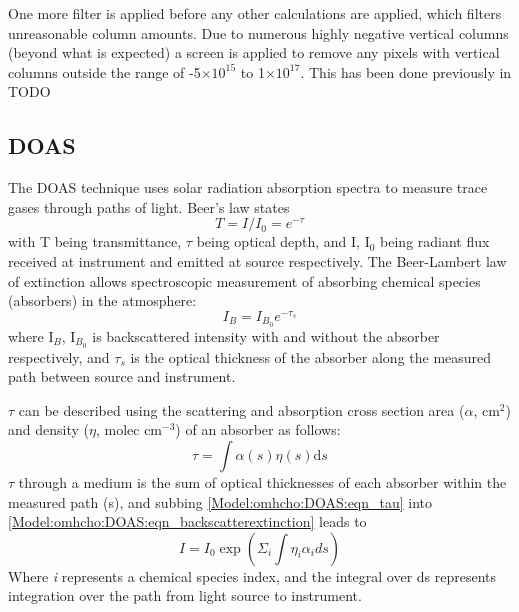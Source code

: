   One more filter is applied before any other calculations are applied, which filters unreasonable column amounts.
  Due to numerous highly negative vertical columns (beyond what is expected) a screen is applied to remove any pixels with vertical columns outside the range of -5$\times 10^{15}$ to 1$\times 10^{17}$.
  This has been done previously in TODO %
  
  \subsection{DOAS}
    \label{Model:omhcho:DOAS}
    
    The DOAS technique uses solar radiation absorption spectra to measure trace gases through paths of light.
    Beer's law states
    \begin{equation} \label{Model:omhcho:DOAS:eqn_beerslaw}
    T = I/I_0 = e^{-\tau}
    \end{equation}
    with T being transmittance, $\tau$ being optical depth, and I, I$_0$ being radiant flux received at instrument and emitted at source respectively.
    The Beer-Lambert law of extinction allows spectroscopic measurement of absorbing chemical species (absorbers) in the atmosphere:
    \begin{equation} \label{Model:omhcho:DOAS:eqn_backscatterextinction}
    I_B = I_{B_0} e^{-\tau_s}
    \end{equation}
    where I$_B$, I$_{B_0}$ is backscattered intensity with and without the absorber respectively, and $\tau_s$ is the optical thickness of the absorber along the measured path between source and instrument.
    
    $\tau$ can be described using the scattering and absorption cross section area ($\alpha$, cm$^{2}$) and density ($\eta$, molec cm$^{-3}$) of an absorber as follows:
    \begin{equation} \label{Model:omhcho:DOAS:eqn_tau}
    \tau = \int \alpha(s) \eta(s) \mathrm{d}s
    \end{equation}
    $\tau$ through a medium is the sum of optical thicknesses of each absorber within the measured path (s), and subbing \ref{Model:omhcho:DOAS:eqn_tau} into \ref{Model:omhcho:DOAS:eqn_backscatterextinction} leads to
    \begin{equation*}
      I = I_0 \exp { \left( \Sigma_i \int \eta_i \alpha_i ds \right) }
    \end{equation*}
    Where \textit{i} represents a chemical species index, and the integral over ds represents integration over the path from light source to instrument.
    
